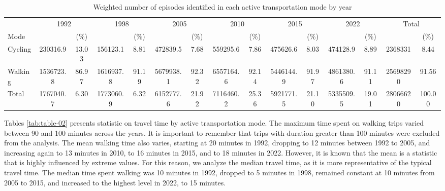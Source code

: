 \documentclass[preprint, 3p,
authoryear]{elsarticle} %
\begin{document}
\begin{longtable}[t]{lcccccccccccccc}
\caption{\label{tab:bulding table-01}\label{tab:episodes-count-percentages}Weighted number of episodes identified in each active transportation mode by year}\\
\toprule
\multicolumn{1}{c}{ } & \multicolumn{2}{c}{1992} & \multicolumn{2}{c}{1998} & \multicolumn{2}{c}{2005} & \multicolumn{2}{c}{2010} & \multicolumn{2}{c}{2015} & \multicolumn{2}{c}{2022} & \multicolumn{2}{c}{Total} \\
\cmidrule(l{3pt}r{3pt}){2-3} \cmidrule(l{3pt}r{3pt}){4-5} \cmidrule(l{3pt}r{3pt}){6-7} \cmidrule(l{3pt}r{3pt}){8-9} \cmidrule(l{3pt}r{3pt}){10-11} \cmidrule(l{3pt}r{3pt}){12-13} \cmidrule(l{3pt}r{3pt}){14-15}
Mode &  & (\%) &  & (\%) &  & (\%) &  & (\%) &  & (\%) &  & (\%) &  & (\%)\\
\midrule
Cycling & 230316.9 & 13.03 & 156123.1 & 8.81 & 472839.5 & 7.68 & 559295.6 & 7.86 & 475626.6 & 8.03 & 474128.9 & 8.89 & 2368331 & 8.44\\
Walking & 1536723.8 & 86.97 & 1616937.8 & 91.19 & 5679938.1 & 92.32 & 6557164.6 & 92.14 & 5446144.9 & 91.97 & 4861380.6 & 91.11 & 25698290 & 91.56\\
Total & 1767040.7 & 6.30 & 1773060.9 & 6.32 & 6152777.6 & 21.92 & 7116460.2 & 25.36 & 5921771.5 & 21.10 & 5335509.5 & 19.01 & 28066620 & 100.00\\
\bottomrule
\end{longtable}
\endgroup{}

Tables \ref{tab:table-02} presents statistic on travel time by active
transportation mode. The maximum time spent on walking trips varied
between 90 and 100 minutes across the years. It is important to remember
that trips with duration greater than 100 minutes were excluded from the
analysis. The mean walking time also varies, starting at 20 minutes in
1992, dropping to 12 minutes between 1992 to 2005, and increasing again
to 13 minutes in 2010, to 16 minutes in 2015, and to 18 minutes in 2022.
However, it is known that the mean is a statistic that is highly
influenced by extreme values. For this reason, we analyze the median
travel time, as it is more representative of the typical travel time.
The median time spent walking was 10 minutes in 1992, dropped to 5
minutes in 1998, remained constant at 10 minutes from 2005 to 2015, and
increased to the highest level in 2022, to 15 minutes.

\begingroup\fontsize{8}{10}\selectfont
\end{document}
